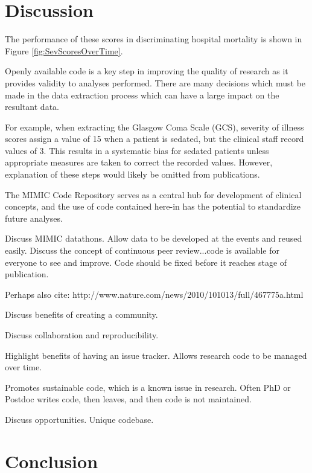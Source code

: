 \documentclass{bioinfo}
\begin{document}

\section{Discussion}

The performance of these scores in discriminating hospital mortality is shown in Figure \ref{fig:SevScoresOverTime}.

Openly available code is a key step in improving the quality of research as it provides validity to analyses performed. There are many decisions which must be made in the data extraction process which can have a large impact on the resultant data. 

For example, when extracting the Glasgow Coma Scale (GCS), severity of illness scores assign a value of 15 when a patient is sedated, but the clinical staff record values of 3. This results in a systematic bias for sedated patients unless appropriate measures are taken to correct the recorded values. However, explanation of these steps would likely be omitted from publications. 

The MIMIC Code Repository serves as a central hub for development of clinical concepts, and the use of code contained here-in has the potential to standardize future analyses.

Discuss MIMIC datathons. Allow data to be developed at the events and reused easily. Discuss the concept of continuous peer review...code is available for everyone to see and improve. Code should be fixed before it reaches stage of publication.

Perhaps also cite: http://www.nature.com/news/2010/101013/full/467775a.html

Discuss benefits of creating a community.

Discuss collaboration and reproducibility.

Highlight benefits of having an issue tracker. Allows research code to be managed over time. 

Promotes sustainable code, which is a known issue in research. Often PhD or Postdoc writes code, then leaves, and then code is not maintained.

Discuss opportunities. Unique codebase. 

\section{Conclusion}
\end{document}
